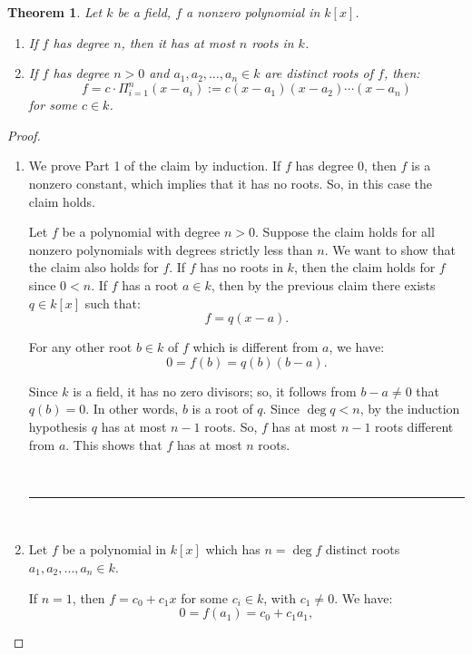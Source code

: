\documentclass[a4paper,12pt]{report}
\newcounter{statement}
\numberwithin{statement}{chapter}
\newtheorem{thm}[statement]{Theorem}
\numberwithin{equation}{chapter}
\numberwithin{section}{chapter}
\numberwithin{subsection}{section}
\begin{document}
\begin{thm}
Let $k$ be a field, $f$ a nonzero polynomial in $k[x]$.
\begin{enumerate}
\item 
If $f$ has degree $n$, then it has at most $n$ roots in $k$.

\item 
If $f$ has degree $n > 0$ and $a_1, a_2,\ldots, a_n \in k$ are distinct
roots of $f$, then:
\[
f = c\cdot \Pi_{i = 1}^n(x - a_i) := c(x - a_1)(x - a_2)\cdots (x - a_n)
\]
for some $c \in k$.
\end{enumerate}
\end{thm}
\begin{proof}

\begin{enumerate}
\item 

We prove Part 1 of the claim by induction.
If $f$ has degree 0, then $f$ is a nonzero constant, which implies that it has no roots.
So, in this case the claim holds.




Let $f$ be a polynomial with degree $n > 0$.
Suppose the claim holds for all nonzero polynomials with degrees strictly less than $n$.
We want to show that the claim also holds for $f$.
If $f$ has no roots in $k$, then the claim holds for $f$ since $0 < n$.
If $f$ has a root $a \in k$, then by the previous claim there exists $q \in k[x]$
such that:
\[
f  = q(x - a).
\]

For any other root $b \in k$ of $f$ which is different from $a$, we have:
\[
0 = f(b) = q(b)(b - a).
\]

Since $k$ is a field, it has no zero divisors; so, it follows from $b - a \neq 0$ that $q(b) = 0$.
In other words, $b$ is a root of $q$.  Since $\deg q < n$,
by the induction hypothesis $q$ has at most $n - 1$ roots.
So, $f$ has at most $n - 1$ roots different from $a$.  This shows that $f$ has at most $n$ roots.


\quad\\\hrule
\quad\\


\item 

Let $f$ be a polynomial in $k[x]$ which has $n = \deg f$ distinct roots $a_1, a_2, \ldots, a_n \in k$.




If $n = 1$, then $f = c_0 + c_1 x$ for some $c_i \in k$, with $c_1 \neq 0$.
We have:
\[
0 = f(a_1) = c_0 + c_1a_1,
\]


\end{enumerate}
\end{proof}
\end{document}
